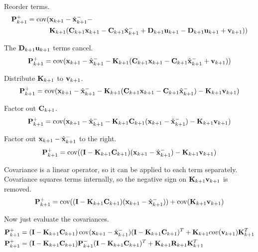 Reorder terms.
\begin{align*}
  \mathbf{P}_{k+1}^+ = \operatorname{cov}(&\mathbf{x}_{k+1} - \hat{\mathbf{x}}_{k+1}^- - \\
    &\mathbf{K}_{k+1}(\mathbf{C}_{k+1} \mathbf{x}_{k+1} -
      \mathbf{C}_{k+1} \hat{\mathbf{x}}_{k+1}^- + \mathbf{D}_{k+1} \mathbf{u}_{k+1} -
      \mathbf{D}_{k+1}\mathbf{u}_{k+1} + \mathbf{v}_{k+1}))
\end{align*}

The $\mathbf{D}_{k+1}\mathbf{u}_{k+1}$ terms cancel.
\begin{equation*}
  \mathbf{P}_{k+1}^+ = \operatorname{cov}(\mathbf{x}_{k+1} - \hat{\mathbf{x}}_{k+1}^- -
    \mathbf{K}_{k+1}(\mathbf{C}_{k+1}\mathbf{x}_{k+1} -
    \mathbf{C}_{k+1} \hat{\mathbf{x}}_{k+1}^- + \mathbf{v}_{k+1}))
\end{equation*}

Distribute $\mathbf{K}_{k+1}$ to $\mathbf{v}_{k+1}$.
\begin{equation*}
  \mathbf{P}_{k+1}^+ = \operatorname{cov}(\mathbf{x}_{k+1} - \hat{\mathbf{x}}_{k+1}^- -
    \mathbf{K}_{k+1}(\mathbf{C}_{k+1}\mathbf{x}_{k+1} -
    \mathbf{C}_{k+1} \hat{\mathbf{x}}_{k+1}^-) - \mathbf{K}_{k+1}\mathbf{v}_{k+1})
\end{equation*}

Factor out $\mathbf{C}_{k+1}$.
\begin{equation*}
  \mathbf{P}_{k+1}^+ = \operatorname{cov}(\mathbf{x}_{k+1} - \hat{\mathbf{x}}_{k+1}^- -
    \mathbf{K}_{k+1}\mathbf{C}_{k+1}(\mathbf{x}_{k+1} - \hat{\mathbf{x}}_{k+1}^-) -
    \mathbf{K}_{k+1}\mathbf{v}_{k+1})
\end{equation*}

Factor out $\mathbf{x}_{k+1} - \hat{\mathbf{x}}_{k+1}^-$ to the right.
\begin{equation*}
  \mathbf{P}_{k+1}^+ = \operatorname{cov}((\mathbf{I} - \mathbf{K}_{k+1}\mathbf{C}_{k+1})
    (\mathbf{x}_{k+1} - \hat{\mathbf{x}}_{k+1}^-) - \mathbf{K}_{k+1}\mathbf{v}_{k+1})
\end{equation*}

Covariance is a linear operator, so it can be applied to each term separately.
Covariance squares terms internally, so the negative sign on
$\mathbf{K}_{k+1}\mathbf{v}_{k+1}$ is removed.
\begin{equation*}
  \mathbf{P}_{k+1}^+ = \operatorname{cov}((\mathbf{I} - \mathbf{K}_{k+1}\mathbf{C}_{k+1})
    (\mathbf{x}_{k+1} - \hat{\mathbf{x}}_{k+1}^-)) + \operatorname{cov}(\mathbf{K}_{k+1}\mathbf{v}_{k+1})
\end{equation*}

Now just evaluate the covariances.
\begin{align*}
  \mathbf{P}_{k+1}^+ &= (\mathbf{I} - \mathbf{K}_{k+1}\mathbf{C}_{k+1})
    \operatorname{cov}(\mathbf{x}_{k+1} - \hat{\mathbf{x}}_{k+1}^-)
    (\mathbf{I} - \mathbf{K}_{k+1}\mathbf{C}_{k+1})^T + \mathbf{K}_{k+1}cov(\mathbf{v}_{k+1})
    \mathbf{K}_{k+1}^T \\
  \mathbf{P}_{k+1}^+ &= (\mathbf{I} - \mathbf{K}_{k+1}\mathbf{C}_{k+1})\mathbf{P}_{k+1}^-
    (\mathbf{I} - \mathbf{K}_{k+1}\mathbf{C}_{k+1})^T + \mathbf{K}_{k+1}\mathbf{R}_{k+1}
    \mathbf{K}_{k+1}^T
\end{align*}

